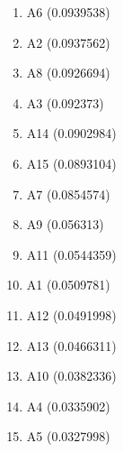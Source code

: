 \begin{enumerate}
\item A6 (0.0939538)
\item A2 (0.0937562)
\item A8 (0.0926694)
\item A3 (0.092373)
\item A14 (0.0902984)
\item A15 (0.0893104)
\item A7 (0.0854574)
\item A9 (0.056313)
\item A11 (0.0544359)
\item A1 (0.0509781)
\item A12 (0.0491998)
\item A13 (0.0466311)
\item A10 (0.0382336)
\item A4 (0.0335902)
\item A5 (0.0327998)
\end{enumerate}